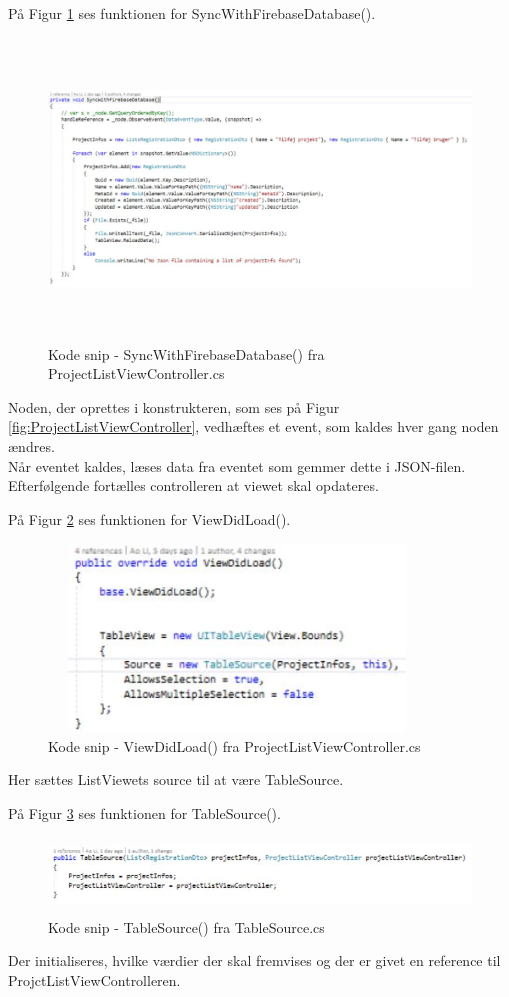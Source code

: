 På Figur \ref{fig:SyncWithDB} ses funktionen for SyncWithFirebaseDatabase().
\begin{figure}[H] %
	\centering
	\includegraphics[height=8cm, width=15cm]{../ArkitekturDesign/Design/ProjectList/SyncWithDB}
	\caption{Kode snip - SyncWithFirebaseDatabase() fra ProjectListViewController.cs}
	\label{fig:SyncWithDB}
\end{figure}
Noden, der oprettes i konstrukteren, som ses på Figur \ref{fig:ProjectListViewController}, vedhæftes et event, som kaldes hver gang noden ændres. \\
Når eventet kaldes, læses data fra eventet som gemmer dette i JSON-filen. Efterfølgende fortælles controlleren at viewet skal opdateres.

På Figur \ref{fig:ViewDidLoad} ses funktionen for ViewDidLoad().
\begin{figure}[H] %
	\centering
	\includegraphics[height=5cm, width=10cm]{../ArkitekturDesign/Design/ProjectList/ViewDidLoad}
	\caption{Kode snip - ViewDidLoad() fra ProjectListViewController.cs}
	\label{fig:ViewDidLoad}
\end{figure}
Her sættes ListViewets source til at være TableSource.

\clearpage

På Figur \ref{fig:TableSource} ses funktionen for TableSource().
\begin{figure}[H] %
	\centering
	\includegraphics[height=2cm, width=15cm]{../ArkitekturDesign/Design/ProjectList/TableSource}
	\caption{Kode snip - TableSource() fra TableSource.cs}
	\label{fig:TableSource}
\end{figure}
Der initialiseres, hvilke værdier der skal fremvises og der er givet en reference til ProjctListViewControlleren.

